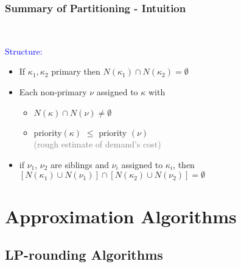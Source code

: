 \documentclass[hyperref,dvipsnames,svgnames,compress]{beamer}
\begin{document}
\begin{frame}
  \frametitle{Summary of Partitioning - Intuition}

\begin{minipage}{2in}
{\ }
\end{minipage}
\hspace{-0.5in}
\begin{minipage}{2.6in}
\noindent \textcolor{blue}{Structure:}
\noindent
  \begin{itemize}\addtolength{\itemsep}{1\baselineskip}
  \item If $\kappa_1,\kappa_2$ primary then $N(\kappa_1)\cap N(\kappa_2) = \emptyset$
  \item Each non-primary $\nu$ assigned to $\kappa$ with 
	\begin{itemize}
		\item $N(\kappa)\cap N(\nu) \neq \emptyset$
		\item priority$(\kappa)$ $\le$ priority $(\nu)$
		\\
		\textcolor{gray}{(rough estimate of demand's cost)}
	\end{itemize}
  \item if $\nu_1$, $\nu_2$ are siblings and 
		$\nu_i$ assigned to $\kappa_i$, then
		$[N(\kappa_1) \cup N(\nu_1)] \cap [N(\kappa_2) \cup N(\nu_2)] = \emptyset$
  \end{itemize}
\end{minipage}
\end{frame}

\section[Algorithms]{Approximation Algorithms}
\subsection[Rounding]{LP-rounding Algorithms}
\end{document}
